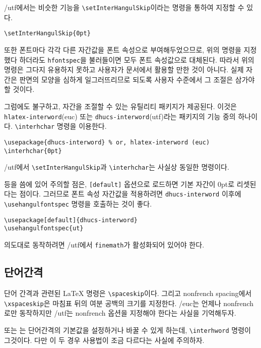 \kotex/utf에서는 비슷한 기능을 \verb|\setInterHangulSkip|이라는
명령을 통하여 지정할 수 있다.
\begin{verbatim}
\setInterHangulSkip{0pt}
\end{verbatim}
또한 폰트마다 각각 다른 자간값을 폰트 속성으로 부여해두었으므로,
위의 명령을 지정했다 하더라도 \verb|hfontspec|을 불러들이면
모두 폰트 속성값으로 대체된다. 따라서 위의 명령은 그다지 유용하지
못하고 사용자가 문서에서 활용할 만한 것이 아니다. 실제 자간은
판면의 모양을 심하게 일그러뜨리므로 되도록 사용자 수준에서 그 조절은
삼가야 할 것이다.

그럼에도 불구하고, 자간을 조절할 수 있는 유틸리티 패키지가 제공된다.
이것은 \texttt{hlatex-interword}(euc) 또는 \texttt{dhucs-interword}(utf)라는
패키지의 기능 중의 하나이다. \verb|\interhchar| 명령을 이용한다.
\begin{verbatim}
\usepackage{dhucs-interword} % or, hlatex-interword (euc)
\interhchar{0pt}
\end{verbatim}

\kotex/utf에서 \verb|\setInterHangulSkip|과 \verb|\interhchar|는
사실상 동일한 명령이다. 

 등을 씀에 있어 주의할 점은,
\texttt{[default]} 옵션으로 
로드하면 기본 자간이 $0$pt로 리셋된다는 점이다. 그러므로 폰트 속성
자간값을 적용하려면 \texttt{dhucs-interword} 이후에 
\verb|\usehangulfontspec| 명령을 호출하는 것이 좋다. 
\begin{verbatim}
\usepackage[default]{dhucs-interword}
\usehangulfontspec{ut}
\end{verbatim}

\가 의도대로 동작하려면  \kotex/utf에서
\texttt{finemath}가 활성화되어 있어야 한다.

\subsection{단어간격}\label{sec:interword}

단어 간격과 관련된 \LaTeX{} 명령은 \verb|\spaceskip|이다. 그리고
nonfrench spacing에서 \verb|\xspaceskip|은 마침표 뒤의 여분 공백의
크기를 지정한다. \kotex/euc는 언제나 nonfrench로만 동작하지만
\kotex/utf는 nonfrench 옵션을 지정해야 한다는 사실을 기억해두자. 

 또는 는
단어간격의 기본값을 설정하거나 바꿀 수 있게 하는데, \verb|\interhword|
명령이 그것이다. 다만 이 두 경우 사용법이 조금 다르다는 사실에 주의하자.

\medskip

